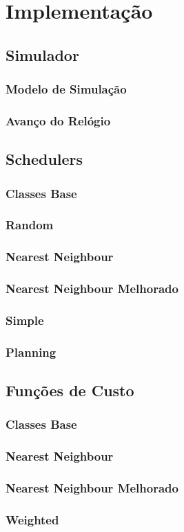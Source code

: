 \chapter{\label{chap:impl}Implementação}

\section{Simulador}
\subsection{Modelo de Simulação}
\subsection{Avanço do Relógio}

\section{Schedulers}
\subsection{Classes Base}
\subsection{Random}
\subsection{Nearest Neighbour}
\subsection{Nearest Neighbour Melhorado}
\subsection{Simple}
\subsection{Planning}

\section{Funções de Custo}
\subsection{Classes Base}
\subsection{Nearest Neighbour}
\subsection{Nearest Neighbour Melhorado}
\subsection{Weighted}